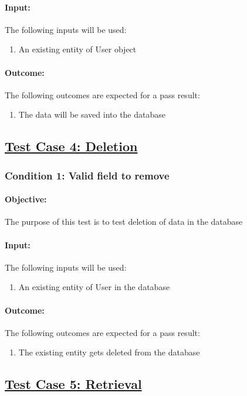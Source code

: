 \documentclass{article}
\begin{document}
\paragraph{Input:} The following inputs will be used:
\begin{enumerate}
	\item An existing entity of User object
\end{enumerate}
\paragraph{Outcome:} The following outcomes are expected for a pass result:
\begin{enumerate}
	\item The data will be saved into the database
\end{enumerate}

\subsection{\underline{Test Case 4: Deletion}}\label{test4}
\subsubsection{Condition 1: Valid field to remove }
\paragraph{Objective:} The purpose of this test is to test deletion of data in the database
\paragraph{Input:} The following inputs will be used:
\begin{enumerate}
	\item An existing entity of User in the database
\end{enumerate}
\paragraph{Outcome:} The following outcomes are expected for a pass result:
\begin{enumerate}
	\item The existing entity gets deleted from the database 
\end{enumerate}

\subsection{\underline{Test Case 5: Retrieval}}\label{test5}
\end{document}
